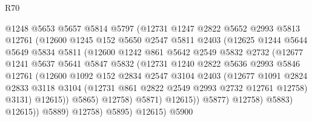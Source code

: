 \begin{lexlean}{R70}
\begin{coremodule}
                      @1248
                      @5653
                      @5657
                      @5814
                      @5797
                      (@12731
                        @1247
                        @2822
                        @5652
                        @2993
                        @5813
                        @12761
                        (@12600
                          @1245
                          @152
                          @5650
                          @2547
                          @5811
                          @2403
                          (@12625
                            @1244
                            @5644
                            @5649
                            @5834
                            @5811
                            (@12600
                              @1242
                              @861
                              @5642
                              @2549
                              @5832
                              @2732
                              (@12677
                                @1241
                                @5637
                                @5641
                                @5847
                                @5832
                                (@12731
                                  @1240
                                  @2822
                                  @5636
                                  @2993
                                  @5846
                                  @12761
                                  (@12600
                                    @1092
                                    @152
                                    @2834
                                    @2547
                                    @3104
                                    @2403
                                    (@12677
                                      @1091
                                      @2824
                                      @2833
                                      @3118
                                      @3104
                                      (@12731 @861 @2822 @2549 @2993 @2732 @12761 @12758)
                                      @3131)
                                    @12615))
                                @5865)
                              @12758)
                            @5871)
                          @12615))
                      @5877)
                    @12758)
                  @5883)
                @12615))
            @5889)
          @12758)
        @5895)
      @12615)
    @5900

\end{coremodule}
\end{lexlean}

